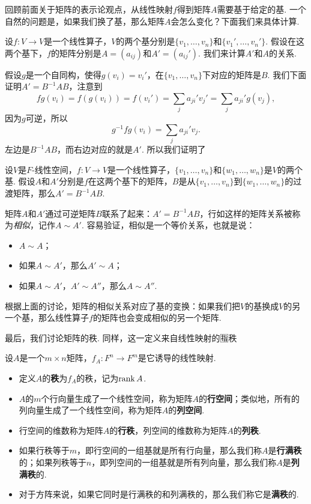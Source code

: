 回顾前面关于矩阵的表示论观点，从线性映射$f$得到矩阵$A$需要基于给定的基. 一个自然的问题是，如果我们换了基，那么矩阵$A$会怎么变化？下面我们来具体计算. 

设$f:V\to V$是一个线性算子，$V$的两个基分别是$\{v_1,\dots,v_n\}$和$\{v_1',\dots,v_n'\}$. 假设在这两个基下，$f$的矩阵分别是$A=(a_{ij})$和$A'=(a_{ij}')$. 我们来计算$A'$和$A$的关系. 

假设$g$是一个自同构，使得$g(v_i)=v_i'$，在$\{v_1,\dots,v_n\}$下对应的矩阵是$B$. 我们下面证明$A'=B^{-1}AB$，注意到
\[fg(v_i)=f(g(v_i))=f(v_i')=\sum_{j}a_{ji}'v_j'=\sum_{j}a_{ji}'g(v_j),\]
因为$g$可逆，所以
\[g^{-1}fg(v_i)=\sum_{j}a_{ji}'v_j.\]
左边是$B^{-1}AB$，而右边对应的就是$A'$. 所以我们证明了

\begin{theorem}\label{thm:base-change}
    设$V$是$F$-线性空间，$f:V\to V$是一个线性算子，$\{v_1,\dots,v_n\}$和$\{w_1,\dots,w_n\}$是$V$的两个基. 假设$A$和$A'$分别是$f$在这两个基下的矩阵，$B$是从$\{v_1,\dots,v_n\}$到$\{w_1,\dots,w_n\}$的过渡矩阵，那么$A'=B^{-1}AB$. 
\end{theorem}

矩阵$A$和$A'$通过可逆矩阵$B$联系了起来：$A'=B^{-1}AB$，行如这样的矩阵关系被称为\emph{相似}，记作$A\sim A'$. 容易验证，相似是一个等价关系，也就是说：
\begin{itemize}
    \item $A\sim A$；
    \item 如果$A\sim A'$，那么$A'\sim A$；
    \item 如果$A\sim A'$，$A'\sim A''$，那么$A\sim A''$.
\end{itemize}

根据上面的讨论，矩阵的相似关系对应了基的变换：如果我们把$V$的基换成$V$的另一个基，那么线性算子$f$的矩阵也会变成相似的另一个矩阵. 

最后，我们讨论矩阵的秩. 同样，这一定义来自线性映射的🈯秩

\begin{definition}
设$A$是一个$m\times n$矩阵，$f_A:F^n\to F^m$是它诱导的线性映射.
\begin{itemize}
    \item 定义$A$的\textbf{秩}为$f_A$的秩，记为$\operatorname*{rank} A$.
    \item $A$的$m$个行向量生成了一个线性空间，称为矩阵$A$的\textbf{行空间}；类似地，所有的列向量生成了一个线性空间，称为矩阵$A$的\textbf{列空间}.
    \item 行空间的维数称为矩阵$A$的\textbf{行秩}，列空间的维数称为矩阵$A$的\textbf{列秩}.
    \item 如果行秩等于$m$，即行空间的一组基就是所有行向量，那么我们称$A$是\textbf{行满秩}的；如果列秩等于$n$，即列空间的一组基就是所有列向量，那么我们称$A$是\textbf{列满秩}的.
    \item  对于方阵来说，如果它同时是行满秩的和列满秩的，那么我们称它是\textbf{满秩}的. 
\end{itemize}
\end{definition}

